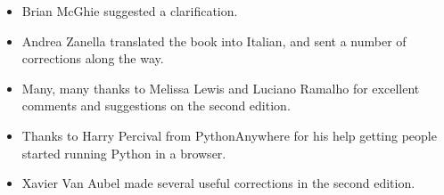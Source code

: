 \begin{itemize}
\item Brian McGhie suggested a clarification.

\item Andrea Zanella translated the book into Italian, and sent a
number of corrections along the way.

\item Many, many thanks to Melissa Lewis and Luciano Ramalho for
  excellent comments and suggestions on the second edition.

\item Thanks to Harry Percival from PythonAnywhere for his help
getting people started running Python in a browser.

\item Xavier Van Aubel made several useful corrections in the second
edition.


\end{itemize}

\normalsize
\clearemptydoublepage

\begin{latexonly}

\tableofcontents

\clearemptydoublepage

\end{latexonly}